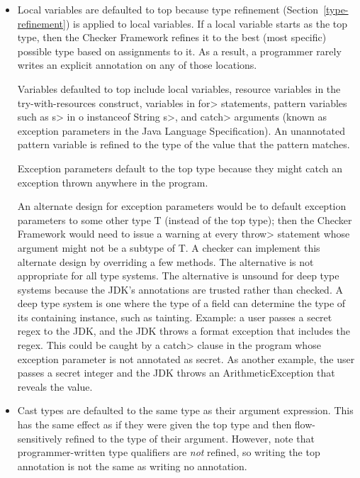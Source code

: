 \begin{itemize}
\item
Local variables are defaulted to top because type refinement
(Section~\ref{type-refinement}) is applied to local variables.  If a local
variable starts as the top type, then the Checker Framework refines it to
the best (most specific) possible type based on assignments to it.  As a
result, a programmer rarely writes an explicit annotation on any of those
locations.

Variables defaulted to top include local variables, resource variables in the
try-with-resources construct, variables in \<for> statements, pattern
variables such as \<s> in \<o instanceof String s>, and \<catch>
arguments (known as exception parameters in the Java Language Specification).
An unannotated pattern variable is refined to the type of the value that the
pattern matches.

Exception parameters default to the top type because they might catch an
exception thrown anywhere in the program.

An alternate design for exception parameters would be to default exception
parameters to some other type T (instead of the top type); then the Checker
Framework would need to issue a warning at every \<throw> statement whose
argument might not be a subtype of T\@.  A checker can implement this
alternate design by overriding a few methods.  The alternative is not
appropriate for all type systems.  The alternative is unsound for deep type
systems because the JDK's annotations are trusted rather than checked.  A
deep type system is one where the type of a field can determine the type of
its containing instance, such as tainting.  Example: a user passes a secret
regex to the JDK, and the JDK throws a format exception that includes the
regex.  This could be caught by a \<catch> clause in the program whose
exception parameter is not annotated as secret.  As another example, the
user passes a secret integer and the JDK throws an ArithmeticException
that reveals the value.


\item
Cast types are defaulted to the same type as their argument expression.
This has the same effect as if they were given the
top type and then flow-sensitively refined to the type of their argument.
However, note that programmer-written type qualifiers are \emph{not}
refined, so writing the top annotation is not the same as writing no annotation.


\end{itemize}

